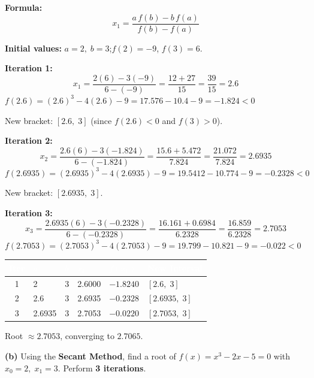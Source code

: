 \documentclass[12pt]{article}
\begin{document}
\begin{ansbox}
\textbf{Formula:}
\[
  x_1 = \frac{a\,f(b) - b\,f(a)}{f(b) - f(a)}
\]

\textbf{Initial values:} $a=2,\;b=3$;\quad $f(2)=-9$,\; $f(3)=6$.

\medskip\textbf{Iteration 1:}
\[
  x_1 = \frac{2(6) - 3(-9)}{6-(-9)} = \frac{12+27}{15} = \frac{39}{15} = 2.6
\]
$f(2.6) = (2.6)^3 - 4(2.6) - 9 = 17.576 - 10.4 - 9 = -1.824 < 0$

New bracket: $[2.6,\;3]$ (since $f(2.6)<0$ and $f(3)>0$).

\medskip\textbf{Iteration 2:}
\[
  x_2 = \frac{2.6(6) - 3(-1.824)}{6-(-1.824)} = \frac{15.6+5.472}{7.824} = \frac{21.072}{7.824} = 2.6935
\]
$f(2.6935) = (2.6935)^3 - 4(2.6935) - 9 = 19.5412 - 10.774 - 9 = -0.2328 < 0$

New bracket: $[2.6935,\;3]$.

\medskip\textbf{Iteration 3:}
\[
  x_3 = \frac{2.6935(6) - 3(-0.2328)}{6-(-0.2328)} = \frac{16.161+0.6984}{6.2328} = \frac{16.859}{6.2328} = 2.7053
\]
$f(2.7053) = (2.7053)^3 - 4(2.7053) - 9 = 19.799 - 10.821 - 9 = -0.022 < 0$

\medskip
\begin{center}
\begin{tabular}{|c|C{1.5cm}|C{1.5cm}|C{2cm}|C{2.2cm}|C{1.8cm}|}
\hline
{}
\textcolor{white}{\textbf{Iter}} & \textcolor{white}{\textbf{$a$}} & \textcolor{white}{\textbf{$b$}} & \textcolor{white}{\textbf{$x_k$}} & \textcolor{white}{\textbf{$f(x_k)$}} & \textcolor{white}{\textbf{New Interval}}\\
 & 2 & 3 & 2.6000 & $-1.8240$ & $[2.6,\;3]$\\ & 2.6 & 3 & 2.6935 & $-0.2328$ & $[2.6935,\;3]$\\ & 2.6935 & 3 & 2.7053 & $-0.0220$ & $[2.7053,\;3]$\\\hline
\end{tabular}
\end{center}

Root $\approx \mathbf{2.7053}$, converging to $2.7065$.
\end{ansbox}

\medskip
\textbf{(b)} Using the \textbf{Secant Method}, find a root of $f(x) = x^3 - 2x - 5 = 0$ with $x_0 = 2,\;x_1 = 3$. Perform \textbf{3 iterations}.
\end{document}
